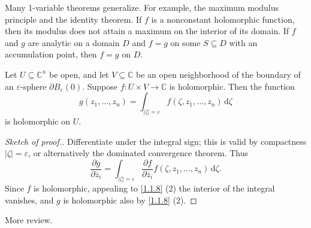 Many 1-variable theorems generalize. For example, the maximum modulus principle and the identity theorem. If $f$ is a nonconstant holomorphic function, then its modulus does not attain a maximum on the interior of its domain. If $f$ and $g$ are analytic on a domain $D$ and $f=g$ on some $S\subseteq D$ with an accumulation point, then $f=g$ on $D$.

\begin{lemma}\label{1.1.11}
	Let $U\subseteq \mathbb{C} ^n$ be open, and let $V\subseteq \mathbb{C} $ be an open neighborhood of the boundary of an $\varepsilon $-sphere $\partial B_\varepsilon (0)$. Suppose $f : U\times V \to \mathbb{C} $ is holomorphic. Then the function
	\[
		g(z_1, \ldots ,z_n)=\int_{\left| \zeta  \right| =\varepsilon } f(\zeta , z_1, \ldots ,z_n) \,\mathrm{d} \zeta 
	\]
	is holomorphic on $U$.
\end{lemma}
\begin{proof}[Sketch of proof.]
	Differentiate under the integral sign; this is valid by compactness $\left| \zeta  \right| =\varepsilon $, or alternatively the dominated convergence theorem. Thus
	\[
		\frac{\partial g}{\partial \overline{z} _i} =\int _{\left| \zeta  \right| =\varepsilon } \frac{\partial f}{\partial \overline{z} _i} f(\zeta ,z_1, \ldots ,z_n) \,\mathrm{d} \zeta 
	.\]
	Since $f$ is holomorphic, appealing to \cref{1.1.8} (2) the interior of the integral vanishes, and $g$ is holomorphic also by \cref{1.1.8} (2).
\end{proof}

More review.

